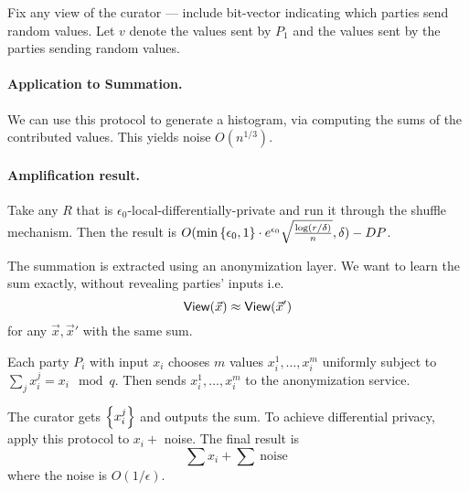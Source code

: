 Fix any view of the curator --- include bit-vector indicating which parties send random values. Let $v$ denote the values sent by $P_1$ and the values sent by the parties sending random values.


\paragraph{Application to Summation.}
We can use this protocol to generate a histogram,
via computing the sums of the contributed values.
This yields noise $O(n^{1/3})$.

\paragraph{Amplification result.}
Take any $R$ that is $\epsilon_0$-local-differentially-private and run it through the shuffle mechanism.
Then the result is $O(\min\left\{\epsilon_0, 1\right\} \cdot e^{\epsilon_0} \sqrt{\frac{\log(r/\delta)}{n}}, \delta) - DP$.


The summation is extracted using an anonymization layer.
We want to learn the sum exactly, without revealing parties' inputs i.e.
\[
    \mathsf{View}(\vec{x}) \approx \mathsf{View}(\vec{x}')
\]
for any $\vec{x}, \vec{x}'$ with the same sum.

\begin{prcl}
Each party $P_i$ with input $x_i$ chooses $m$ values $x_i^1, \dots, x_i^m$ uniformly subject to $\sum_j x_i^j = x_i \mod q$.
Then sends $x_i^1, \dots, x_i^m$ to the anonymization service.

The curator gets $\left\{x_i^j\right\}$ and outputs the sum.
To achieve differential privacy, apply this protocol to $x_i +$ noise.
The final result is 
\[
    \sum x_i + \sum~\text{noise}~ 
\]
where the noise is $O(1/\epsilon)$.
\end{prcl}

